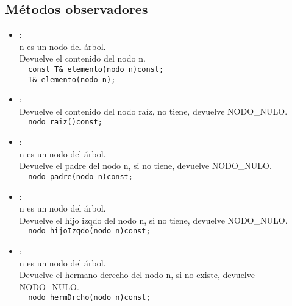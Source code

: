 \subsection*{Métodos observadores}
\begin{itemize}
  \item {}:\\
   n es un nodo del árbol.\\
   Devuelve el contenido del nodo n.\\
  \verb|  const T& elemento(nodo n)const;|\\
  \verb|  T& elemento(nodo n);|
  \item {}:\\
   Devuelve el contenido del nodo raíz, no tiene, devuelve NODO\_NULO.\\
  \verb|  nodo raiz()const;|
  \item {}:\\
   n es un nodo del árbol.\\
   Devuelve el padre del nodo n, si no tiene, devuelve NODO\_NULO.\\
  \verb|  nodo padre(nodo n)const;|
  \item {}:\\
   n es un nodo del árbol.\\
   Devuelve el hijo izqdo del nodo n, si no tiene, devuelve NODO\_NULO.\\
  \verb|  nodo hijoIzqdo(nodo n)const;|
  \item {}:\\
   n es un nodo del árbol.\\
   Devuelve el hermano derecho del nodo n, si no existe, devuelve\\NODO\_NULO.\\
  \verb|  nodo hermDrcho(nodo n)const;|
\end{itemize}